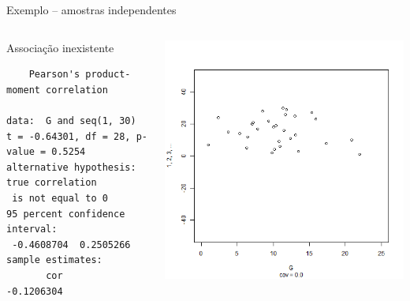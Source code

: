 \documentclass{beamer}
\begin{document}
\begin{frame}[fragile]{\scriptsize Exemplo -- amostras independentes}
  \begin{columns}
    \begin{column}{6cm}
      \begin{exampleblock}{Associação inexistente}
        \tiny
\begin{verbatim}
	Pearson's product-moment correlation

data:  G and seq(1, 30)
t = -0.64301, df = 28, p-value = 0.5254
alternative hypothesis: true correlation
 is not equal to 0
95 percent confidence interval:
 -0.4608704  0.2505266
sample estimates:
       cor 
-0.1206304
\end{verbatim}
    \end{exampleblock}
   \end{column}
    \begin{column}{4cm}
  \begin{center}
    \includegraphics[height=.8\textheight]{Cap17/anim-n}
  \end{center}
    \end{column}
\end{columns}
\end{frame}
\end{document}

